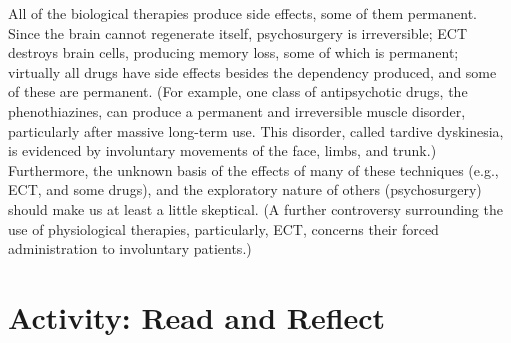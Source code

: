 \documentclass[
]{book}
\begin{document}
All of the biological therapies produce side effects, some of them permanent. Since the brain cannot regenerate itself, psychosurgery is irreversible; ECT destroys brain cells, producing memory loss, some of which is permanent; virtually all drugs have side effects besides the dependency produced, and some of these are permanent. (For example, one class of antipsychotic drugs, the phenothiazines, can produce a permanent and irreversible muscle disorder, particularly after massive long-term use. This disorder, called tardive dyskinesia, is evidenced by involuntary movements of the face, limbs, and trunk.) Furthermore, the unknown basis of the effects of many of these techniques (e.g., ECT, and some drugs), and the exploratory nature of others (psychosurgery) should make us at least a little skeptical. (A further controversy surrounding the use of physiological therapies, particularly, ECT, concerns their forced administration to involuntary patients.)

\hypertarget{activity-read-and-reflect-21}{%
\section*{Activity: Read and Reflect}\label{activity-read-and-reflect-21}}
\end{document}
